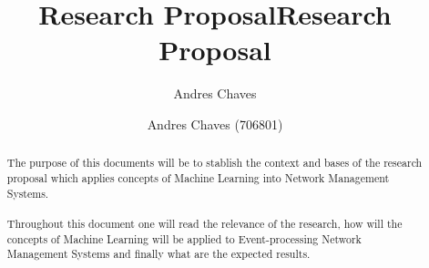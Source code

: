 \documentclass[10pt,a4paper]{article}
\author{Andres Chaves}
\title{Research Proposal}
\begin{document}
 \title{Research Proposal}
 \author{Andres Chaves (706801) \\
  }
 \maketitle

\begin{abstract}
    The purpose of this documents will be to stablish the context and bases of the research proposal which applies concepts of Machine Learning into Network Management Systems.
   \\\\
   Throughout this document one will read the relevance of the research, how will the concepts of Machine Learning will be applied to Event-processing Network Management Systems and finally what are the expected results.
\end{abstract}


\tableofcontents

  
\end{document}

